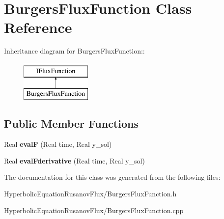 \hypertarget{classBurgersFluxFunction}{
\section{BurgersFluxFunction Class Reference}
\label{classBurgersFluxFunction}
}
Inheritance diagram for BurgersFluxFunction::\begin{figure}[H]
\begin{center}
\leavevmode
\includegraphics[height=2cm]{classBurgersFluxFunction}
\end{center}
\end{figure}
\subsection*{Public Member Functions}
\begin{DoxyCompactItemize}
\item 
\hypertarget{classBurgersFluxFunction_a89fdd1c6cc40707e2a83701eda1777d0}{
Real {\bfseries evalF} (Real time, Real y\_\-sol)}
\label{classBurgersFluxFunction_a89fdd1c6cc40707e2a83701eda1777d0}

\item 
\hypertarget{classBurgersFluxFunction_ad86ece8a9bf4750a6159311390efa6cd}{
Real {\bfseries evalFderivative} (Real time, Real y\_\-sol)}
\label{classBurgersFluxFunction_ad86ece8a9bf4750a6159311390efa6cd}

\end{DoxyCompactItemize}


The documentation for this class was generated from the following files:\begin{DoxyCompactItemize}
\item 
HyperbolicEquationRusanovFlux/BurgersFluxFunction.h\item 
HyperbolicEquationRusanovFlux/BurgersFluxFunction.cpp\end{DoxyCompactItemize}
